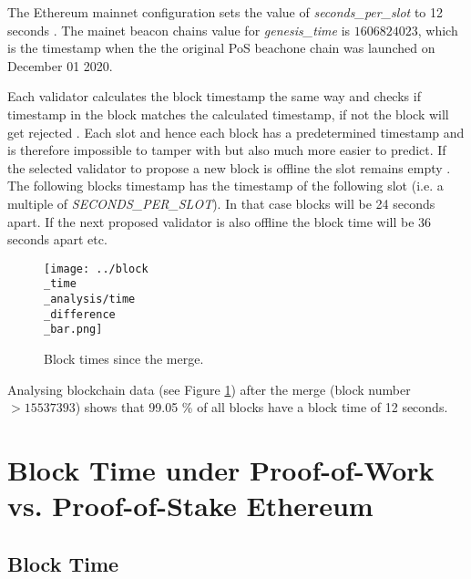 The Ethereum mainnet configuration sets the
value of \textit{seconds\_per\_slot} to 12 seconds
\cite{seconds-per-slot-mainnet} \cite{seconds-per-slot-mainnet-doc}. The mainet
beacon chains value for \textit{genesis\_time} is $1606824023$, which is the
timestamp when the the original PoS beachone chain was launched on December 01
2020.

Each validator calculates the block timestamp the same way and checks if
timestamp in the block matches the calculated timestamp, if not the block will
get rejected \cite{process-execution-payload}. Each slot and hence each block
has a predetermined timestamp and is therefore impossible to tamper with but
also much more easier to predict. If the selected validator to propose a new
block is offline the slot remains empty \cite{validator-offline}. The following
blocks timestamp has the timestamp of the following slot (i.e. a multiple of
\textit{SECONDS\_PER\_SLOT}). In that case blocks will be 24 seconds apart. If
the next proposed validator is also offline the block time will be 36 seconds
apart etc.

\begin{figure}[H]
  \centering
  \texttt{[image: ../block\\\_time\\\_analysis/time\\\_difference\\\_bar.png]}
  \caption{Block times since the merge.}
  \label{fig:block_time_analysis}
\end{figure}

Analysing blockchain data (see Figure \ref{fig:block_time_analysis}) after the
merge (block number $> 15537393$) shows that 99.05 \% of all blocks have a
block time of 12 seconds.


\section{Block Time under Proof-of-Work vs. Proof-of-Stake Ethereum}
\subsection{Block Time}
